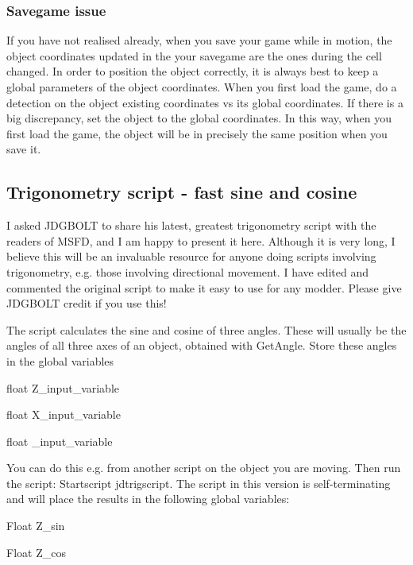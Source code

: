 \hypertarget{savegame-issue}{%
\subsubsection{\texorpdfstring{Savegame issue
}{Savegame issue }}\label{savegame-issue}}

If you have not realised already, when you save your game while in
motion, the object coordinates updated in the your savegame are the ones
during the cell changed. In order to position the object correctly, it
is always best to keep a global parameters of the object coordinates.
When you first load the game, do a detection on the object existing
coordinates vs its global coordinates. If there is a big discrepancy,
set the object to the global coordinates. In this way, when you first
load the game, the object will be in precisely the same position when
you save it.

\hypertarget{trigonometry-script---fast-sine-and-cosine}{%
\subsection{\texorpdfstring{\hfill\break
Trigonometry script - fast sine and
cosine}{ Trigonometry script - fast sine and cosine}}\label{trigonometry-script---fast-sine-and-cosine}}

I asked JDGBOLT to share his latest, greatest trigonometry script with
the readers of MSFD, and I am happy to present it here. Although it is
very long, I believe this will be an invaluable resource for anyone
doing scripts involving trigonometry, e.g. those involving directional
movement. I have edited and commented the original script to make it
easy to use for any modder. Please give JDGBOLT credit if you use this!

The script calculates the sine and cosine of three angles. These will
usually be the angles of all three axes of an object, obtained with
GetAngle. Store these angles in the global variables

float Z\_input\_variable

float X\_input\_variable

float \_input\_variable

You can do this e.g. from another script on the object you are moving.
Then run the script: Startscript jdtrigscript. The script in this
version is self-terminating and will place the results in the following
global variables:

Float Z\_sin

Float Z\_cos

